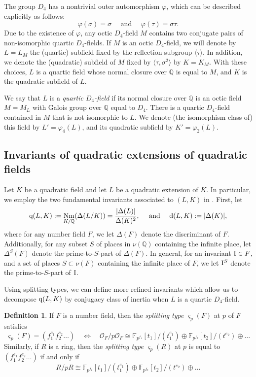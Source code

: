\documentclass[10pt]{article}
\theoremstyle{plain}
\theoremstyle{definition}
\newtheorem{defn}[thm]{Definition}
\theoremstyle{remark}
\def\Disc{{\Delta}}
\def\bF{{\mathbb F}}
\def\bQ{{\mathbb Q}}
\def\bF{{\mathbb F}}
\def\bQ{{\mathbb Q}}
\def\cO{{\mathcal O}}
\newcommand{\rotation}{\sigma}
\newcommand{\reflection}{\tau}
\newcommand{\outeraut}{\varphi}
\newcommand{\D}{{\rm d}}
\newcommand{\q}{{\rm q}}
\DeclareMathOperator{\Nm}{Nm}
\begin{document}
  
The group $D_4$ has a nontrivial outer automorphism $\outeraut$, which
can be described explicitly as follows:
\begin{equation*}
\outeraut(\rotation) = \rotation \quad \mbox{ and } \quad
\outeraut(\reflection) = \rotation\reflection.
\end{equation*}
Due to the existence of $\outeraut$, any octic $D_4$-field $M$
contains two conjugate pairs of non-isomorphic quartic $D_4$-fields.
If $M$ is an octic $D_4$-field, we will denote by $L=L_M$ the
(quartic) subfield fixed by the reflection subgroup $\langle
\reflection \rangle$. In addition, we denote the (quadratic) subfield
of $M$ fixed by $\langle \tau, \sigma^2 \rangle$ by $K=K_M$. With these
choices, $L$ is a quartic field whose normal closure over $\bQ$ is
equal to $M$, and $K$ is the quadratic subfield of $L$.

We say that $L$ is a {\em quartic $D_4$-field} if its normal closure
over $\bQ$ is an octic field $M=M_L$ with Galois group over $\bQ$ equal
to $D_4$. There is a quartic $D_4$-field contained in $M$ that is
not isomorphic to $L$. We denote (the isomorphism class of) this field
by $L'=\varphi_4(L)$, and its quadratic subfield by $K'=\varphi_2(L)$.

\subsection{Invariants of quadratic extensions of quadratic fields}

Let $K$ be a quadratic field and let $L$ be a quadratic extension of
$K$. In particular,
we employ the two fundamental invariants associated to $(L,K)$ in \cite{D4preprint}. First, let
\begin{equation*}
\q(L,K) := \Nm_{K/\bQ}(\Disc(L/K)) = \frac{|\Disc(L)|}{\Disc(K)^2}, \quad
\mbox{ and } \quad \D(L,K) := |\Disc(K)|,
\end{equation*}
where for any number field $F$, we let $\Disc(F)$ denote the discriminant of $F$. Additionally, for any subset $S$ of places in $\nu(\bQ)$ containing the infinite place, let $\Disc^S(F)$ denote the
prime-to-$S$-part of $\Disc(F)$. In general, for an invariant ${\rm I}
\in F$, and a set of places $S \subset \nu(F)$ containing the infinite
place of $F$, we let ${\rm I}^S$ denote the prime-to-$S$-part of
${\rm I}$.

Using splitting types, we can define more refined invariants which
allow us to decompose $\q(L,K)$ by conjugacy class of inertia when $L$ is a quartic $D_4$-field.
\begin{defn}\label{splittingtype}
If $F$ is a number field, then the {\em splitting type}
$\varsigma_p(F)$ at $p$ of $F$ satisfies
\begin{equation*}
  \varsigma_p(F) = (f_1^{e_1}f_2^{e_2} \hdots) \quad \Leftrightarrow \quad \cO_F/p\cO_F
  \cong \bF_{p^{f_1}}[t_1]/(t_1^{e_1}) \oplus \bF_{p^{f_2}}[t_2]/(t^{e_2}) \oplus \hdots
\end{equation*}
Similarly, if $R$ is a ring, then the {\em splitting type}
$\varsigma_p(R)$ at $p$ is equal to $(f_1^{e_1}f_2^{e_2} \hdots)$ if
and only if $$R/pR \cong \bF_{p^{f_1}}[t_1]/(t_1^{e_1}) \oplus
\bF_{p^{f_2}}[t_2]/(t^{e_2}) \oplus \hdots$$
\end{defn}
\end{document}
